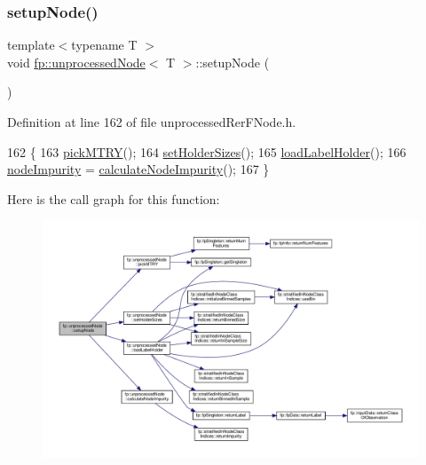 \subsubsection{\texorpdfstring{setup\+Node()}{setupNode()}\hspace{0.1cm}{\footnotesize\ttfamily [1/2]}}
{\footnotesize\ttfamily template$<$typename T $>$ \\
void \hyperlink{classfp_1_1unprocessedNode}{fp\+::unprocessed\+Node}$<$ T $>$\+::setup\+Node (\begin{DoxyParamCaption}{ }\end{DoxyParamCaption})\hspace{0.3cm}{\ttfamily [inline]}}



Definition at line 162 of file unprocessed\+Rer\+F\+Node.\+h.


\begin{DoxyCode}
162                                        \{
163                     \hyperlink{classfp_1_1unprocessedNode_a5302bdd3ad2b0de3e2fcd8ed1bf58f61}{pickMTRY}();
164                     \hyperlink{classfp_1_1unprocessedNode_ae1aa4f8f868fe19c8e48d3fe1e5596a8}{setHolderSizes}();
165                     \hyperlink{classfp_1_1unprocessedNode_a7b286c437f8f73fb3431358c11898a82}{loadLabelHolder}();
166                     \hyperlink{classfp_1_1unprocessedNode_a5bb6906b09625f7893bf0ffd512b1714}{nodeImpurity} = \hyperlink{classfp_1_1unprocessedNode_a0278b4dd8d905d38d75ced9a95839a12}{calculateNodeImpurity}();
167                 \}
\end{DoxyCode}
Here is the call graph for this function\+:
\nopagebreak
\begin{figure}[H]
\begin{center}
\leavevmode
\includegraphics[width=350pt]{classfp_1_1unprocessedNode_a713ab68816b13b1a82d667ac6f1640d7_cgraph}
\end{center}
\end{figure}
\mbox{\label{classfp_1_1unprocessedNode_a713ab68816b13b1a82d667ac6f1640d7}} 
